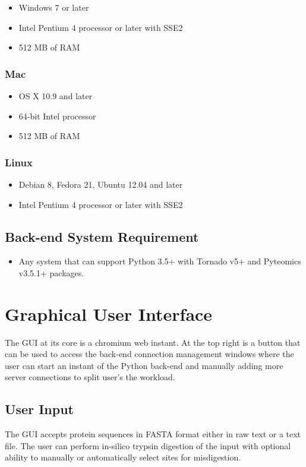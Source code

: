 \documentclass[10pt,a4paper]{memoir}
\begin{document}
\begin{itemize}
	\item Windows 7 or later
	\item Intel Pentium 4 processor or later with SSE2
	\item 512 MB of RAM
\end{itemize}
\subsection{Mac}
\begin{itemize}
	\item OS X 10.9 and later
	\item 64-bit Intel processor
	\item 512 MB of RAM
\end{itemize}
\subsection{Linux}
\begin{itemize}
	\item Debian 8, Fedora 21, Ubuntu 12.04 and later
	\item Intel Pentium 4 processor or later with SSE2
\end{itemize}
\section{Back-end System Requirement}
\begin{itemize}
	\item Any system that can support Python 3.5+ with Tornado v5+ and Pyteomics v3.5.1+ packages.
\end{itemize}
\clearpage
\chapter{Graphical User Interface}
The GUI at its core is a chromium web instant. At the top right is a button that can be used to access the back-end connection management windows where the user can start an instant of the Python back-end and manually adding more server connections to split user's the workload.\par

\section{User Input}
The GUI accepts protein sequences in FASTA format either in raw text or a text file. The user can perform in-silico trypsin digestion of the input with optional ability to manually or automatically select sites for misdigestion.
\end{document}
